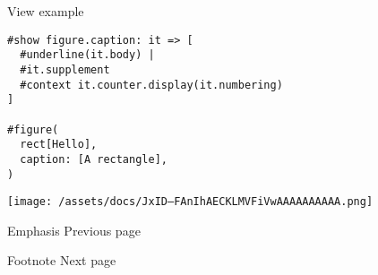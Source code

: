 
View example

\begin{verbatim}
#show figure.caption: it => [
  #underline(it.body) |
  #it.supplement
  #context it.counter.display(it.numbering)
]

#figure(
  rect[Hello],
  caption: [A rectangle],
)
\end{verbatim}

\texttt{[image: /assets/docs/JxID--FAnIhAECKLMVFiVwAAAAAAAAAA.png]}

\href{/docs/reference/model/emph/}{\pandocbounded{}}

{ Emphasis } { Previous page }

\href{/docs/reference/model/footnote/}{\pandocbounded{}}

{ Footnote } { Next page }
